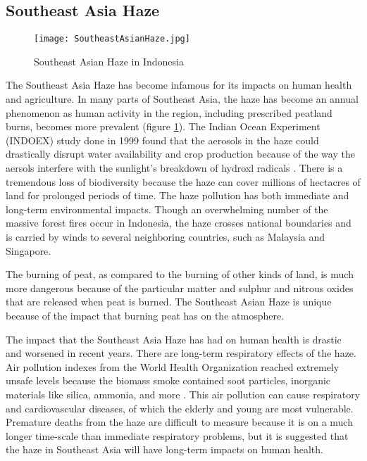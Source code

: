 \subsection{Southeast Asia Haze}

\begin{figure}
  \texttt{[image: SoutheastAsianHaze.jpg]}
  \caption{Southeast Asian Haze in Indonesia}
  \label{fig:southeastasiahaze}
\end{figure}

The Southeast Asia Haze has become infamous for its impacts on human health and agriculture. In many parts of Southeast Asia, the haze has become an annual phenomenon as human activity in the region, including prescribed peatland burns, becomes more prevalent (figure \ref{fig:southeastasiahaze}). The Indian Ocean Experiment (INDOEX) study done in 1999 found that the aerosols in the haze could drastically disrupt water availability and crop production because of the way the aersols interfere with the sunlight's breakdown of hydroxl radicals \citep{taylor2003abcs}. There is a tremendous loss of biodiversity because the haze can cover millions of hectacres of land for prolonged periods of time. The haze pollution has both immediate and long-term environmental impacts. Though an overwhelming number of the massive forest fires occur in Indonesia, the haze crosses national boundaries and is carried by winds to several neighboring countries, such as Malaysia and Singapore.    

The burning of peat, as compared to the burning of other kinds of land, is much more dangerous because of the particular matter and sulphur and nitrous oxides that are released when peat is burned. The Southeast Asian Haze is unique because of the impact that burning peat has on the atmosphere. 

The impact that the Southeast Asia Haze has had on human health is drastic and worsened in recent years. There are long-term respiratory effects of the haze. Air pollution indexes from the World Health Organization reached extremely unsafe levels because the biomass smoke contained soot particles, inorganic materials like silica, ammonia, and more \citep{sastry2002forest}. This air pollution can cause respiratory and cardiovascular diseases, of which the elderly and young are most vulnerable. Premature deaths from the haze are difficult to measure because it is on a much longer time-scale than immediate respiratory problems, but it is suggested that the haze in Southeast Asia will have long-term impacts on human health.

